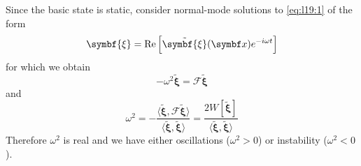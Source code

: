 \documentclass{jknotes}
\newcommand{\disp}{\symbf{\xi}}
\begin{document}
Since the basic state is static, consider normal-mode solutions to
\eqref{eq:l19:1} of the form
\begin{equation}
	\disp = \Re\left[ \tilde{\disp}(\x) e^{-i\omega t}\right]
\end{equation}
for which we obtain
\begin{equation}
	-\omega^2 \tilde{\disp} = \mathcal{F} \tilde{\disp}
\end{equation}
and
\begin{equation}
	\omega^2 = -\frac{\langle \tilde{\disp}, \mathcal{F} \tilde{\disp}
	\rangle}{\langle \tilde{\disp}, \tilde{\disp} \rangle} =
	\frac{2W\left[\tilde{\disp}\right]}{\langle \tilde{\disp},
		\tilde{\disp}\rangle}
\end{equation}
Therefore $\omega^2$ is real and we have either oscillations ($\omega^2 > 0$)
or instability ($\omega^2 < 0$).
\end{document}
